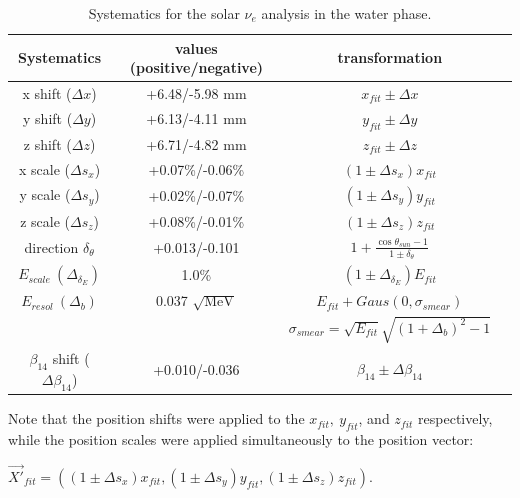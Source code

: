 \begin{table}[ht]
	\centering
	\caption{Systematics for the solar $\nu_e$ analysis in the water phase.}
	\label{tab:solar_uncertainties}
	\begin{tabular*}{150mm}{c@{\extracolsep{\fill}}ccc}
		\toprule
		Systematics & values (positive/negative) & transformation   \\
		\hline
		x shift ($\Delta x$) & +6.48/-5.98 mm  & $x_{fit}\pm \Delta x$ \\	
		y shift ($\Delta y$)& +6.13/-4.11 mm   & $y_{fit}\pm \Delta y$ \\
		z shift ($\Delta z$)& +6.71/-4.82 mm   & $z_{fit}\pm \Delta z$ \\
		x scale ($\Delta s_x$)& +0.07\%/-0.06\%  & $(1\pm \Delta s_x)x_{fit}$\\	
		y scale ($\Delta s_y$)& +0.02\%/-0.07\%  & $(1\pm \Delta s_y)y_{fit}$ \\
		z scale ($\Delta s_z$)& +0.08\%/-0.01\%  & $(1\pm \Delta s_z)z_{fit}$ \\
	    direction $\delta_\theta$  & +0.013/-0.101 & $1+\frac{\cos\theta_{sun}-1}{1\pm\delta_\theta}$\\
	    $E_{scale}~(\Delta_{\delta_E})$ &  1.0\%  & $(1\pm \Delta_{\delta_E})E_{fit}$\\
	    $E_{resol}~(\Delta_b)$ &  0.037 $\sqrt{\mathrm{MeV}}$  & $E_{fit}+Gaus(0,\sigma_{smear})$  \\
	    & &$\sigma_{smear}=\sqrt{E_{fit}}\sqrt{(1+\Delta_b)^2-1}$\\
	    $\beta_{14}$ shift ($\Delta \beta_{14}$) & +0.010/-0.036 & $\beta_{14}\pm \Delta \beta_{14}$\\
		\bottomrule
	\end{tabular*}
\end{table}

Note that the position shifts were applied to the $x_{fit},~y_{fit}$, and $z_{fit}$ respectively, while the position scales were applied simultaneously to the position vector: 

$\vec{X'}_{fit}=((1\pm \Delta s_x)x_{fit},(1\pm \Delta s_y)y_{fit},(1\pm \Delta s_z)z_{fit})$.

